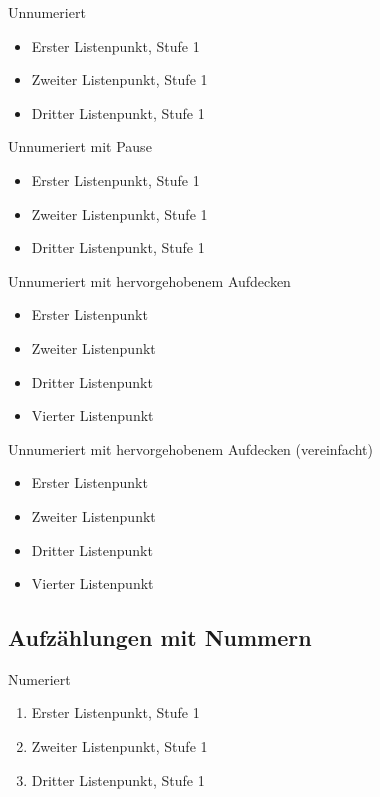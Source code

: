 	\begin{frame}{Unnumeriert}
		\begin{itemize}
			\item Erster Listenpunkt, Stufe 1
			\item Zweiter Listenpunkt, Stufe 1
			\item Dritter Listenpunkt, Stufe 1
		\end{itemize}
	\end{frame}

	\begin{frame}{Unnumeriert mit Pause}
		\begin{itemize}
			\item Erster Listenpunkt, Stufe 1
				\pause
			\item Zweiter Listenpunkt, Stufe 1
				\pause
			\item Dritter Listenpunkt, Stufe 1
		\end{itemize}
	\end{frame}

	\begin{frame}{Unnumeriert mit hervorgehobenem Aufdecken}
		\begin{itemize}
			\item<+-| alert@+> Erster Listenpunkt
			\item<+-| alert@+> Zweiter Listenpunkt
			\item<+-| alert@+> Dritter Listenpunkt
			\item<+-| alert@+> Vierter Listenpunkt
		\end{itemize}
	\end{frame}

	\begin{frame}{Unnumeriert mit hervorgehobenem Aufdecken (vereinfacht)}
		\begin{itemize}[<+-| alert@+>]
			\item Erster Listenpunkt
			\item Zweiter Listenpunkt
			\item Dritter Listenpunkt
			\item Vierter Listenpunkt
		\end{itemize}
	\end{frame}

	\subsection{Aufzählungen mit Nummern}

	\begin{frame}{Numeriert}
		\begin{enumerate}
			\item Erster Listenpunkt, Stufe 1
			\item Zweiter Listenpunkt, Stufe 1
			\item Dritter Listenpunkt, Stufe 1
		\end{enumerate}
	\end{frame}

